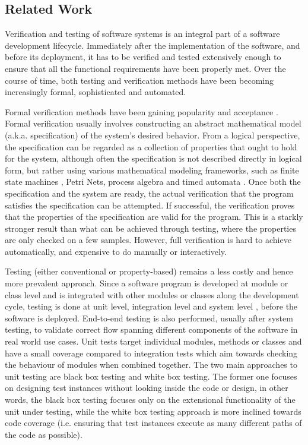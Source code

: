 \raggedbottom
\subsection{Related Work}

Verification and testing of software systems \cite{myers2011art} is an integral part of a software development lifecycle. Immediately after the implementation of the software, and before its deployment, it has to be verified and tested extensively enough to ensure that all the functional requirements have been properly met. Over the course of time, both testing and verification methods have been becoming increasingly formal, sophisticated and automated. 

Formal verification methods \cite{wang2004formal} have been gaining popularity and acceptance \cite{LiquidHaskell,Stainless,Coq}. Formal verification usually involves constructing an abstract mathematical model (a.k.a. specification) of the system's desired behavior. From a logical perspective, the specification can be regarded as a collection of properties that ought to hold for the system, although often the specification is not described directly in logical form, but rather using various mathematical modeling frameworks, such as finite state machines \cite{chow1978testing}, Petri Nets, process algebra and timed automata \cite{clarke1996formal}. Once both the specification and the system are ready, the actual verification that the program satisfies the specification can be attempted. If successful, the verification proves that the properties of the specification are valid for the program. This is a starkly stronger result than what can be achieved through testing, where the properties are only checked on a few samples. However, full verification is hard to achieve automatically, and expensive to do manually or interactively.

Testing (either conventional or property-based) remains a less costly and hence more prevalent approach. Since a software program is developed at module or class level and is integrated with other modules or classes along the development cycle, testing is done at unit level, integration level and system level \cite{myers2011art}, before the software is deployed. End-to-end testing \cite{tsai2001end} is also performed, usually after system testing,%
to validate correct flow spanning different components of the software in real world use cases. Unit tests target individual modules, methods or classes and have a small coverage compared to integration tests which aim towards checking the behaviour of modules when combined together. The two main approaches to unit testing are black box testing and white box testing. The former one focuses on designing test instances without looking inside the code or design, in other words, the black box testing focuses only on the extensional functionality of the unit under testing, while the white box testing approach is more inclined towards code coverage (i.e. ensuring that test instances execute as many different paths of the code as possible).

